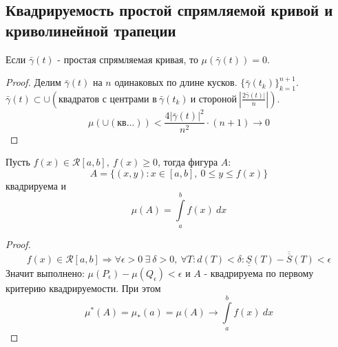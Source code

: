 \subsection{Квадрируемость простой спрямляемой кривой и криволинейной трапеции}
\begin{theorem}
    Если $\bar{\gamma}(t)$ - простая спрямляемая кривая, то $\mu(\bar{\gamma}(t))=0$.
\end{theorem} 
\begin{proof}
    Делим $\bar{\gamma}(t)$ на $n$ одинаковых по длине кусков. $\{\bar{\gamma}(t_k)\}_{k=1}^{n+1}$. $\bar{\gamma}(t)\subset \cup(\text{квадратов с центрами в}\  \bar{\gamma}(t_k)\ \text{и стороной}\ |\frac{2\bar{\gamma}(t)|}{n}|)$. 
    \[\mu(\cup(\text{кв...}))<\frac{4|\bar{\gamma}(t)|^2}{n^2}\cdot (n+1)\to 0\]
\end{proof} 
\begin{theorem}
    Пусть $f(x)\in \mathcal{R}[a,b],\ f(x)\geq 0$, тогда фигура $A:$ 
    \[A=\{(x,y): x\in[a,b],\ 0\leq y\leq f(x)\}\] квадрируема и 
    \[\mu(A)=\int\limits_{a}^{b}f(x)\ dx\]
\end{theorem} 
\begin{proof}
    \[f(x)\in \mathcal{R}[a,b] \Rightarrow \forall \epsilon>0\ \exists\ \delta>0,\ \forall T: d(T)<\delta: \underline{\underline{S}}(T)-\overline{\overline{S}}(T)<\epsilon\]
    Значит выполнено: $\mu(P_{\epsilon})-\mu(Q_{\epsilon})<\epsilon$ и $A$ - квадрируема по первому критерию квадрируемости. При этом
    \[\mu^*(A)=\mu_*(a)=\mu(A) \to \int\limits_{a}^{b}f(x)\ dx\]
\end{proof} 